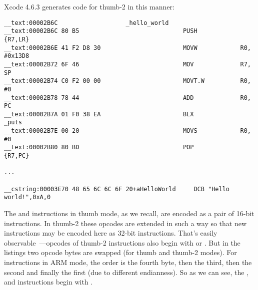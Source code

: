 Xcode 4.6.3 
{generates code for thumb-2 in this manner}:

\begin{lstlisting}[caption=\OptimizingXcode + \ThumbTwoMode]
__text:00002B6C                   _hello_world
__text:00002B6C 80 B5                             PUSH            {R7,LR}
__text:00002B6E 41 F2 D8 30                       MOVW            R0, #0x13D8
__text:00002B72 6F 46                             MOV             R7, SP
__text:00002B74 C0 F2 00 00                       MOVT.W          R0, #0
__text:00002B78 78 44                             ADD             R0, PC
__text:00002B7A 01 F0 38 EA                       BLX             _puts
__text:00002B7E 00 20                             MOVS            R0, #0
__text:00002B80 80 BD                             POP             {R7,PC}

...

__cstring:00003E70 48 65 6C 6C 6F 20+aHelloWorld     DCB "Hello world!",0xA,0
\end{lstlisting}

{The  and  instructions in thumb mode, as we recall, are encoded as a pair
of 16-bit instructions.
In thumb-2 these  opcodes are extended in such a way so that new instructions
may be encoded here as 32-bit instructions}.
{That's
easily observable~---opcodes of thumb-2 instructions also begin with  or }.
{But in the \IDA listings
two opcode bytes are swapped (for thumb and thumb-2 modes).  For instructions in ARM mode, the order is the fourth byte, then the third,
then the second and finally the first (due to different \gls{endianness})}.
{So as we can see, the ,  and  instructions begin with} .

